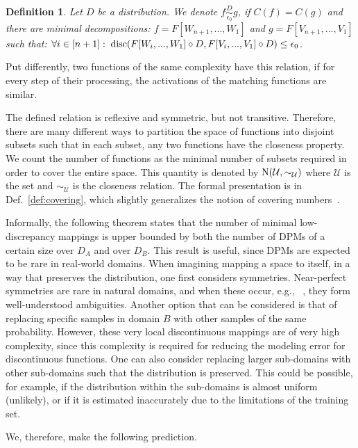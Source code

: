 \documentclass{article} %
\newtheorem{defn}{Definition}
\newcommand{\disc}{\textnormal{disc}}
\newcommand{\Cov}{\textnormal{N}}
\begin{document}
\begin{defn}\label{def:closedInformal} Let $D$ be a distribution. We denote $f \overset{D}{\underset{\epsilon_0}{\sim}} g $, if $C(f) = C(g)$ and there are minimal decompositions: $f = F[W_{n+1},...,W_1]$ and $g = F[V_{n+1},...,V_1]$ such that: $\forall i \in [n+1]:\; \disc(F[W_{i},...,W_1] \circ D ,  F[V_{i},...,V_1] \circ D) \leq \epsilon_0$.
\end{defn}

Put differently, two functions of the same complexity have this relation, if for every step of their processing, the activations of the matching functions are similar.

The defined relation is reflexive and symmetric, but not transitive. Therefore, there are many different ways to partition the space of functions into disjoint subsets such that in each subset, any two functions have the closeness property. We count the number of functions as the minimal number of subsets required in order to cover the entire space. This quantity is denoted by $\Cov(\mathcal{U},\sim_{\mathcal{U}})$ where $\mathcal{U}$ is the set and $\sim_{\mathcal{U}}$ is the closeness relation. The formal presentation is in Def.~\ref{def:covering}, which slightly generalizes the notion of covering numbers~\citep{Anthony:2009:NNL:1795646}.


Informally, the following theorem states that the number of minimal low-discrepancy mappings is upper bounded by both the number of DPMs of a certain size over $D_A$ and over $D_B$. This result is useful, since DPMs are expected to be rare in real-world domains. When imagining mapping a space to itself, in a way that preserves the distribution, one first considers symmetries. Near-perfect symmetries are rare in natural domains, and when these occur, e.g., ~\citep{discogan}, they form well-understood ambiguities. Another option that can be considered is that of replacing specific samples in domain $B$ with other samples of the same probability. However, these very local discontinuous mappings are of very high complexity, since this complexity is required for reducing the modeling error for discontinuous functions. One can also consider replacing larger sub-domains with other sub-domains such that the distribution is preserved. This could be possible, for example, if the distribution within the sub-domains is almost uniform (unlikely), or if it is estimated inaccurately due to the limitations of the training set. 

We, therefore, make the following prediction.
\end{document}
